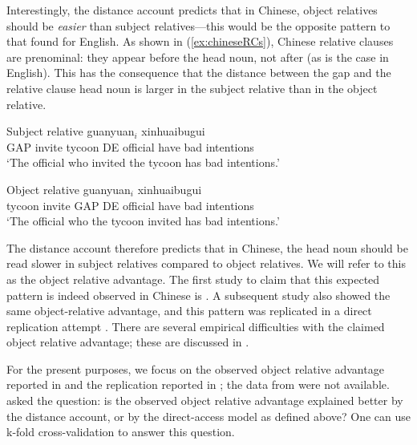 \documentclass{cambridge7A}\usepackage[]{graphicx}\usepackage[]{color}
\begin{document}
Interestingly, the distance account predicts that in Chinese, object relatives should be \textit{easier} than subject relatives---this would be the opposite pattern to that found for English. As shown in (\ref{ex:chineseRCs}), Chinese relative clauses are prenominal: they appear before the head noun, not after (as is the case in English). This has the consequence that the distance between the  gap and the relative clause head noun is larger in the subject relative than in the object relative. 

\begin{exe}
\ex  \label{ex:chineseRCs}
\begin{xlist}
\item
Subject relative
 guanyuan$_i$ xinhuaibugui \\
GAP invite tycoon DE official {have bad intentions}\\
\glt `The official who invited the tycoon has bad intentions.’
\item 
Object relative 
 guanyuan$_i$ xinhuaibugui \\
tycoon invite GAP DE official { have bad intentions}\\
\glt `The official who the tycoon invited has bad intentions.’
\end{xlist}
\end{exe}

The distance account therefore predicts that in Chinese, the head noun should be read slower in subject relatives compared to object relatives. We will refer to this as the  object relative advantage. The first study to claim that this expected pattern is indeed observed in Chinese is \cite{HsiaoGibson2003}. A  subsequent study \citep{gibsonwu} also showed the same object-relative advantage, and this pattern was replicated in a  direct replication attempt \citep{VasishthChenLi2013}.  There are several empirical difficulties  with the claimed object relative advantage; these are discussed in  \cite{VasishthChenLi2013,WuKaiserVasishth2017,JagerChenLi2015}. 

For the present purposes, we focus on the observed object relative advantage reported in \cite{gibsonwu} and the replication reported in \cite{VasishthChenLi2013}; the data from \cite{HsiaoGibson2003} were not available. \cite{VasishthChopinRyderNicenboimCogSci2017}  asked the question: is the observed  object relative advantage explained better by the distance account, or  by the direct-access model as defined above? One can use  k-fold cross-validation  to answer this question.
\end{document}
